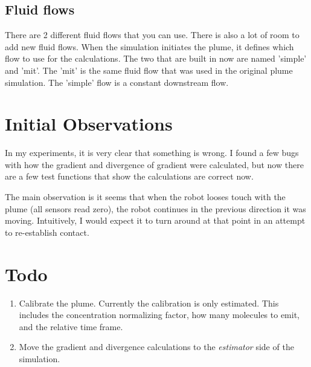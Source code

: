 \documentclass[11pt]{article} %
\begin{document}
\subsection{Fluid flows}
There are 2 different fluid flows that you can use.  There is also a lot of room to add new fluid flows.  When the simulation initiates the plume, it defines which flow to use for the calculations.  The two that are built in now are named 'simple' and 'mit'.  The 'mit' is the same fluid flow that was used in the original plume simulation.  The 'simple' flow is a constant downstream flow.


\section{Initial Observations}
In my experiments, it is very clear that something is wrong.  I found a few bugs with how the gradient and divergence of gradient were calculated, but now there are a few test functions that show the calculations are correct now.  

The main observation is it seems that when the robot looses touch with the plume (all sensors read zero), the robot continues in the previous direction it was moving.  Intuitively, I would expect it to turn around at that point in an attempt to re-establish contact. 



\section{Todo}
\begin{enumerate}
\item Calibrate the plume.  Currently the calibration is only estimated.  This includes the concentration normalizing factor, how many molecules to emit, and the relative time frame.
\item Move the gradient and divergence calculations to the {\it estimator} side of the simulation.
\end{enumerate}









\maketitle
\end{document}
